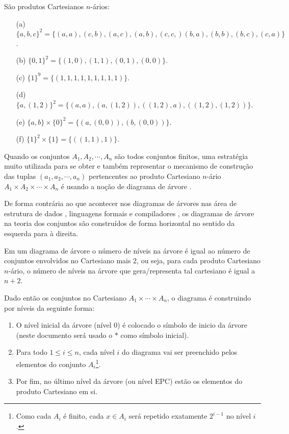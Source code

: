 \begin{exemplo}\label{exe:CartesianoNario3}
  São produtos Cartesianos $n$-ários:
	\begin{itemize}
		\item[(a)] $\{a, b, c\}^2 = \{(a, a), (c, b), (a, c), (a, b), (c, c, )(b, a), (b, b), (b, c), (c, a)\}$.
		\item[(b)] $\{0, 1\}^2 = \{(1, 0), (1, 1), (0, 1), (0, 0)\}$.
		\item[(c)] $\{1\}^9 = \{(1, 1, 1, 1, 1, 1, 1, 1, 1)\}$.
    \item[(d)] $\{a, (1, 2)\}^2 = \{(a, a),  (a, (1, 2)), ((1, 2), a), ((1, 2), (1, 2))\}$.
    \item[(e)] $\{a, b\} \times \{0\}^2 = \{(a, (0,0)), (b, (0,0))\}$.
    \item[(f)] $\{1\}^2 \times \{1\} = \{((1,1), 1)\}$.
	\end{itemize}
\end{exemplo}

Quando os conjuntos $A_1, A_2, \cdots, A_n$ são todos conjuntos finitos, uma estratégia muito utilizada para se obter e também representar o mecanismo de construção das tuplas $(a_1, a_2, \cdots, a_n)$ pertencentes ao produto Cartesiano $n$-ário $A_1 \times A_2 \times \cdots \times A_n$ é usando a noção de diagrama de árvore \cite{lipschutz1978-TC, lipschutz2013-MD}. 

\begin{atencao}
  De forma contrária ao que acontecer nos diagramas de árvores nas área de estrutura de dados \cite{jaime1994}, linguagens formais \cite{benjaLivro2010, hopcroft2008, linz2006} e compiladores \cite{aho2007, cooper2017}, os diagramas de árvore na teoria dos conjuntos são construídos de forma horizontal no sentido da esquerda para à direita.
\end{atencao}

Em um diagrama de árvore o número de níveis na árvore é igual ao número de conjuntos envolvidos no Cartesiano mais 2, ou seja, para cada produto Cartesiano $n$-ário, o número de níveis na árvore que gera/representa tal cartesiano é igual a $n+2$. 

Dado então os conjuntos no Cartesiano $A_1 \times \cdots \times A_n$, o diagrama é construindo por níveis da seguinte forma: 

\begin{enumerate}
  \item O nível inicial da árvore (nível 0) é colocado o símbolo de inicio da árvore (neste documento será usado o $\ast$ como símbolo inicial). 
  \item Para todo $1 \leq i \leq n$, cada nível $i$ do diagrama vai ser preenchido pelos elementos do conjunto $A_i$\footnote{Como cada $A_i$ é finito, cada $x \in A_i$ será repetido exatamente $2^{i-1}$ no nível $i$.}.
  \item Por fim, no último nível da árvore (ou nível EPC) estão os elementos do produto Cartesiano em si.
\end{enumerate}

